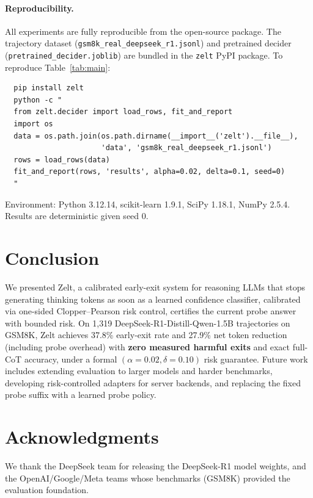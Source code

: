 \documentclass[11pt]{article}
\begin{document}
\paragraph{Reproducibility.}
All experiments are fully reproducible from the open-source package.
The trajectory dataset (\texttt{gsm8k\_real\_deepseek\_r1.jsonl})
and pretrained decider (\texttt{pretrained\_decider.joblib}) are
bundled in the \texttt{zelt} PyPI package.
To reproduce Table~\ref{tab:main}:

\begin{verbatim}
  pip install zelt
  python -c "
  from zelt.decider import load_rows, fit_and_report
  import os
  data = os.path.join(os.path.dirname(__import__('zelt').__file__),
                      'data', 'gsm8k_real_deepseek_r1.jsonl')
  rows = load_rows(data)
  fit_and_report(rows, 'results', alpha=0.02, delta=0.1, seed=0)
  "
\end{verbatim}

Environment: Python 3.12.14, scikit-learn 1.9.1, SciPy 1.18.1,
NumPy 2.5.4. Results are deterministic given seed 0.

\section{Conclusion}
\label{sec:conclusion}

We presented Zelt, a calibrated early-exit system for reasoning LLMs
that stops generating thinking tokens as soon as a learned confidence
classifier, calibrated via one-sided Clopper--Pearson risk control,
certifies the current probe answer with bounded risk.
On 1{,}319 DeepSeek-R1-Distill-Qwen-1.5B trajectories on GSM8K,
Zelt achieves 37.8\% early-exit rate and 27.9\% net token reduction
(including probe overhead) with \textbf{zero measured harmful exits}
and exact full-CoT accuracy, under a formal $(\alpha{=}0.02, \delta{=}0.10)$
risk guarantee.
Future work includes extending evaluation to larger models and harder
benchmarks, developing risk-controlled adapters for server backends,
and replacing the fixed probe suffix with a learned probe policy.

\section*{Acknowledgments}
\label{sec:ack}
We thank the DeepSeek team for releasing the DeepSeek-R1 model weights,
and the OpenAI/Google/Meta teams whose benchmarks (GSM8K) provided
the evaluation foundation.



\end{document}
